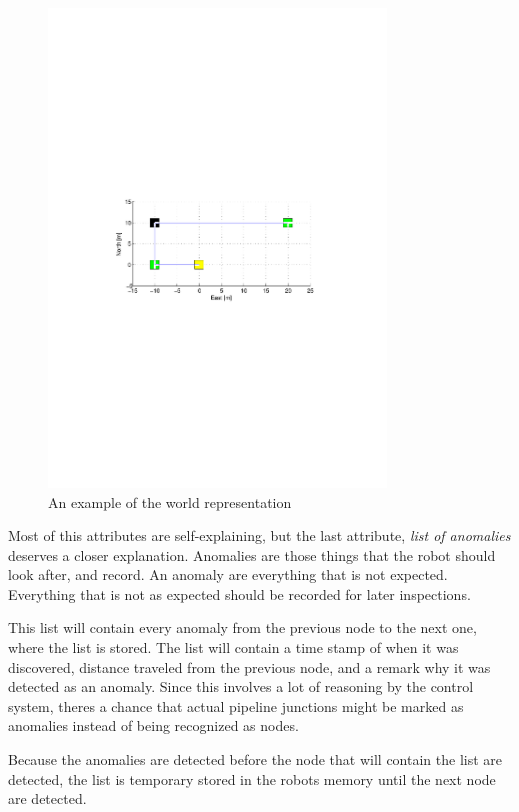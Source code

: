\begin{figure}[htbp]
    \centering
    \includegraphics[width=0.8\textwidth]{pics/worldrepresentation}
    \caption{An example of the world representation}
    \label{chap5:fig-worldrepresentation}
\end{figure}
Most of this attributes are self-explaining, but the last attribute, \emph{list of
anomalies} deserves a closer explanation. 
Anomalies are those things that the robot should look after, and record. An anomaly are
everything that is not expected. Everything that is not as expected should be recorded 
for later inspections. 

This list will contain every anomaly from the previous node to the next one, where the
list is stored. The list will contain a time stamp of when it was discovered, distance
traveled from the previous node, and a remark why it was detected as an anomaly. Since
this involves a lot of reasoning by the control system, theres a chance that actual
pipeline junctions might be marked as anomalies instead of being recognized as nodes.

Because the anomalies are detected before the node that will contain the list are
detected, the list is temporary stored in the robots memory until the next node are
detected. 

